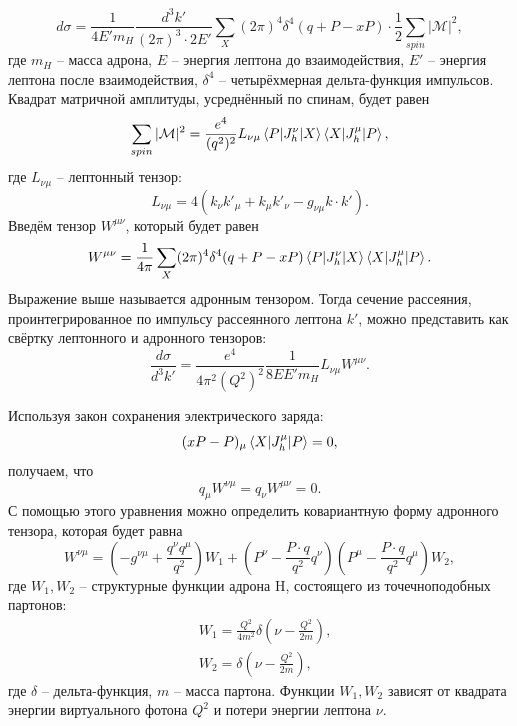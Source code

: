 \documentclass{extarticle}
\begin{document}
\begin{equation}
	d\sigma = \frac{1}{4E' m_H} \frac{d^3k'}{(2\pi)^3 \cdot 2E'} \sum_X (2\pi)^4 \delta^4(q+P-xP) \cdot \frac{1}{2} \sum_{spin} |\mathcal{M}|^2,
\end{equation}
где $m_H$ -- масса адрона, $E$ -- энергия лептона до взаимодействия, $E'$ -- энергия лептона после взаимодействия,  $\delta^4$ -- четырёхмерная дельта-функция импульсов. Квадрат матричной амплитуды, усреднённый по спинам, будет равен
\begin{equation}
	\sum_{spin} |\mathcal{M}|^2 = \frac{e^4}{(q^2)^2}L_{\nu \mu}\braket{P | J_h^\nu | X} \braket{X | J_h^\mu | P}, 
	\label{eq:lepton}
\end{equation}
где $L_{\nu\mu}$ -- лептонный тензор:
\begin{equation}
	L_{\nu\mu} = 4 (k_\nu k'_\mu + k_\mu k'_\nu - g_{\nu\mu}k\cdot k').
\end{equation}
Введём тензор $W^{\mu\nu}$, который будет равен
\begin{equation}
	W^{\mu\nu} = \frac{1}{4\pi} \sum_X (2\pi)^4 \delta^4(q+P-xP) \braket{P | J_h^\nu | X} \braket{X | J_h^\mu | P}.
\end{equation}
Выражение выше называется адронным тензором. Тогда сечение рассеяния, проинтегрированное по импульсу рассеянного лептона $k'$, можно представить как свёртку лептонного и адронного тензоров:
\begin{equation}
	\frac{d\sigma}{d^3 k'} = \frac{e^4}{4\pi^2(Q^2)^2} \frac{1}{8EE'm_H}L_{\nu\mu}W^{\mu\nu}.
\end{equation}

Используя закон сохранения электрического заряда:
\begin{equation}
	(xP-P)_\mu \braket{X | J_h^\mu | P} = 0,
\end{equation}
получаем, что 
\begin{equation}
	q_\mu W^{\nu \mu} = q_\nu W^{\mu \nu} = 0. 
\end{equation}
С помощью этого уравнения можно определить ковариантную форму адронного тензора, которая будет равна
\begin{equation}
	W^{\nu \mu} = (-g^{\nu\mu}+ \frac{q^\nu q^\mu}{q^2})W_1 + (P^\nu - \frac{P\cdot q}{q^2}q^\nu)(P^\mu - \frac{P\cdot q}{q^2} q^\mu) W_2,
\end{equation}
где $W_1, W_2$ -- структурные функции адрона H, состоящего из точечноподобных партонов:
\begin{equation}
\begin{split}
	& W_1  =   \frac{Q^2}{4m^2} \delta(\nu - \frac{Q^2}{2m}), \\
	& W_2  =  \delta(\nu - \frac{Q^2}{2m}),
\end{split}
	\label{eq:deltastruct}
\end{equation}
где $\delta$ -- дельта-функция, $m$ -- масса партона. Функции $W_1, W_2$ зависят от квадрата энергии виртуального фотона $Q^2$ и потери энергии лептона $\nu$.
\end{document}

